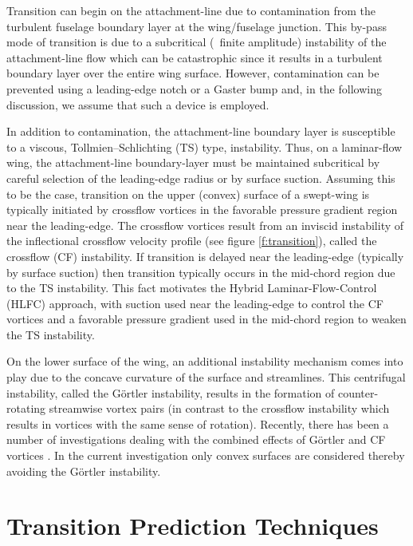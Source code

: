 Transition can begin on the attachment-line due to contamination from the
turbulent fuselage boundary layer at the wing/fuselage junction.  This by-pass
mode of transition is due to a subcritical (\ie\ finite amplitude) instability
of the attachment-line flow which can be catastrophic since it results in a
turbulent boundary layer over the entire wing surface.  However, contamination
can be prevented using a leading-edge notch or a Gaster bump \cite{Gaster:65}
and, in the following discussion, we assume that such a device is employed.

In addition to contamination, the attachment-line boundary layer is
susceptible to a viscous, Tollmien--Schlichting (TS) type, instability.  Thus,
on a laminar-flow wing, the attachment-line boundary-layer must be maintained
subcritical by careful selection of the leading-edge radius or by surface
suction.  Assuming this to be the case, transition on the upper (convex)
surface of a swept-wing is typically initiated by crossflow vortices in the
favorable pressure gradient region near the leading-edge.  The crossflow
vortices result from an inviscid instability of the inflectional crossflow
velocity profile (see figure \ref{f:transition}), called the crossflow (CF)
instability.  If transition is delayed near the leading-edge (typically by
surface suction) then transition typically occurs in the mid-chord region due
to the TS instability.  This fact motivates the Hybrid Laminar-Flow-Control
(HLFC) approach, with suction used near the leading-edge to control the CF
vortices and a favorable pressure gradient used in the mid-chord region to
weaken the TS instability.

On the lower surface of the wing, an additional instability mechanism comes
into play due to the concave curvature of the surface and streamlines.  This
centrifugal instability, called the G\"ortler instability, results in the
formation of counter-rotating streamwise vortex pairs (in contrast to the
crossflow instability which results in vortices with the same sense of
rotation).  Recently, there has been a number of investigations dealing with
the combined effects of G\"ortler and CF vortices
\cite{BaHa:91,Bassom:92,ZuMa:95}.  In the current investigation only convex
surfaces are considered thereby avoiding the G\"ortler instability.

\section{Transition Prediction Techniques \label{s:prediction}}

